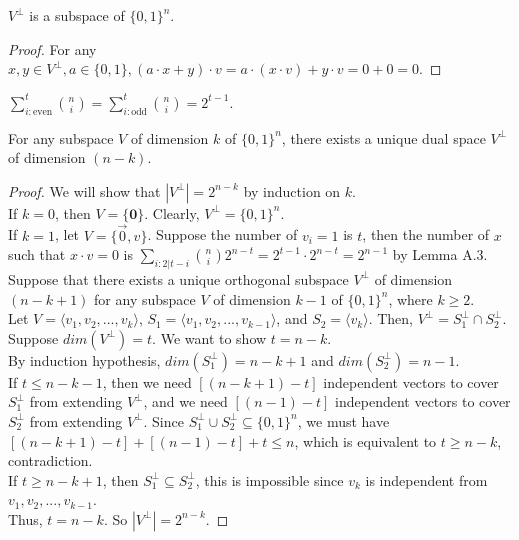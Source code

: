 \begin{theorem}
$V^\perp$ is a subspace of $\{ 0,1 \}^n$.
\end{theorem}

\begin{proof}
For any $x, y \in V^\perp, a \in \{0,1\}, (a \cdot x+y)\cdot v = a \cdot (x \cdot v) + y \cdot v = 0 + 0 = 0$. 
\end{proof} 

\begin{lemma} $\sum \limits_{i: \text{even}}^t {n \choose i} = 
\sum \limits_{i: \text{odd}}^t {n \choose i} = 2^{t-1} $.
\end{lemma}

\begin{theorem} For any subspace $V$ of dimension $k$ of $\{ 0,1 \}^n$, 
there exists a unique dual space $V^\perp$ of dimension $(n-k)$.
\end{theorem}

\begin{proof}
We will show that $|V^\perp| = 2^{n-k}$ by induction on $k$.\\
If $k=0$, then $V = \{ \textbf{0}\}$. Clearly, $V^\perp = \{ 0, 1 \}^n$. \\
If $k=1$, let $V = \{ \vec{0}, v \}$. 
Suppose the number of $v_i = 1$ is $t$, 
then the number of $x$ such that $x \cdot v = 0$ is 
$\sum \limits_{i: 2|t-i} {n \choose i} 2^{n-t} =
2^{t-1} \cdot 2^{n-t} = 2^{n-1}$ by Lemma A.3. \\
Suppose that there exists a unique orthogonal subspace $V^\perp$ 
of dimension $(n-k+1)$ for any subspace $V$ of dimension $k-1$ of $\{ 0,1 \}^n$, where $k \geq 2$. \\
Let $V=\langle v_1, v_2,..., v_{k} \rangle$, 
$S_1 = \langle v_1, v_2,..., v_{k-1}\rangle$, 
and $S_2 = \langle v_{k}\rangle$.  Then, $V^\perp = S_1^\perp \cap S_2^\perp$. \\
Suppose $dim(V^\perp) = t$. We want to show $t = n-k$.\\
By induction hypothesis, $dim(S_1^\perp) = n-k+1$ 
and $dim(S_2^\perp) = n-1$. \\
If $t \leq n-k-1$, then we need $[(n-k+1) - t]$ independent vectors to cover $S_1^\perp$ from extending $V^\perp$, and we need $[(n-1) -t]$ independent vectors to cover $S_2^\perp$ from extending $V^\perp$. Since $S_1^\perp \cup S_2^\perp \subseteq \{ 0,1\}^n$, we must have $[(n-k+1) - t] + [(n-1) -t] + t \leq n$, which is equivalent to $t \geq n-k$, contradiction.\\
If $t \geq n-k+1$, then $S_1^\perp \subseteq S_2^\perp$,
this is impossible since $v_k$ is independent from $v_1, v_2, ..., v_{k-1}$. \\
Thus, $t = n-k$. So $|V^\perp| = 2^{n-k}$. 
\end{proof}



